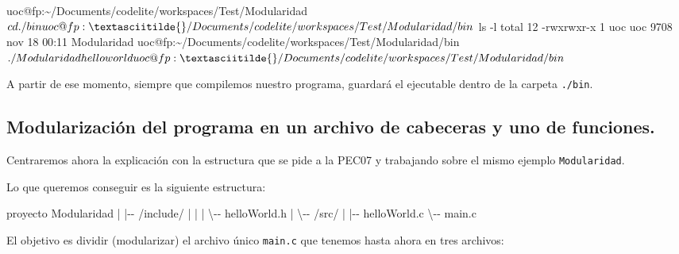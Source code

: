 \documentclass[
]{book}
\newenvironment{Shaded}{\begin{snugshade}}{\end{snugshade}}
\newcommand{\BaseNTok}[1]{\textcolor[rgb]{0.00,0.00,0.81}{#1}}
\newcommand{\DecValTok}[1]{\textcolor[rgb]{0.00,0.00,0.81}{#1}}
\newcommand{\NormalTok}[1]{#1}
\begin{document}
\begin{Shaded}
\begin{Highlighting}[]
\NormalTok{uoc@fp:\textasciitilde{}/Documents/codelite/workspaces/Test/Modularidad$ cd ./bin}
\NormalTok{uoc@fp:\textasciitilde{}/Documents/codelite/workspaces/Test/Modularidad/bin$ ls {-}l}
\NormalTok{total }\DecValTok{12}
\NormalTok{{-}rwxrwxr{-}x }\DecValTok{1}\NormalTok{ uoc uoc }\DecValTok{9708}\NormalTok{ nov }\DecValTok{18} \BaseNTok{00}\NormalTok{:}\DecValTok{11}\NormalTok{ Modularidad}
\NormalTok{uoc@fp:\textasciitilde{}/Documents/codelite/workspaces/Test/Modularidad/bin$ ./Modularidad}
\NormalTok{hello world}
\NormalTok{uoc@fp:\textasciitilde{}/Documents/codelite/workspaces/Test/Modularidad/bin$}
\end{Highlighting}
\end{Shaded}

A partir de ese momento, siempre que compilemos nuestro programa, guardará el ejecutable dentro de la carpeta \texttt{./bin}.

\hypertarget{modularizaciuxf3n-del-programa-en-un-archivo-de-cabeceras-y-uno-de-funciones.}{%
\subsection{Modularización del programa en un archivo de cabeceras y uno de funciones.}\label{modularizaciuxf3n-del-programa-en-un-archivo-de-cabeceras-y-uno-de-funciones.}}

Centraremos ahora la explicación con la estructura que se pide a la PEC07 y trabajando sobre el mismo ejemplo \texttt{Modularidad}.

Lo que queremos conseguir es la siguiente estructura:

\begin{Shaded}
\begin{Highlighting}[]
\NormalTok{proyecto Modularidad}
\NormalTok{   |}
\NormalTok{   |{-}{-} /include/}
\NormalTok{   |     |}
\NormalTok{   |     \textbackslash{}{-}{-} helloWorld.h}
\NormalTok{   |}
\NormalTok{   \textbackslash{}{-}{-} /src/}
\NormalTok{         |}
\NormalTok{         |{-}{-} helloWorld.c}
\NormalTok{         \textbackslash{}{-}{-} main.c}
\end{Highlighting}
\end{Shaded}

El objetivo es dividir (modularizar) el archivo único \texttt{main.c} que tenemos hasta ahora en tres archivos:
\end{document}
